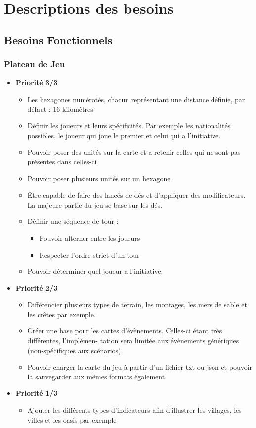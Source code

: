 \documentclass{article}[a4paper, 12pt]
\begin{document}
\section{Descriptions des besoins}
\subsection{Besoins Fonctionnels}
\subsubsection{Plateau de Jeu}

\begin{itemize}
    \item \textbf{Priorité 3/3}
    \begin{itemize}
        \item Les hexagones numérotés, chacun représentant une distance définie, par défaut : 16 kilomètres
        \item Définir les joueurs et leurs spécificités. Par exemple les nationalités possibles, le joueur
qui joue le premier et celui qui a l’initiative.
        \item Pouvoir poser des unités sur la carte et a retenir celles qui ne sont pas présentes dans
celles-ci
        \item Pouvoir poser plusieurs unités sur un hexagone.
        \item Être capable de faire des lancés de dés et d’appliquer des modificateurs. La majeure partie
du jeu se base sur les dés.
        \item Définir une séquence de tour :
        \begin{itemize}
            \item Pouvoir alterner entre les joueurs
            \item Respecter l’ordre strict d’un tour
        \end{itemize}
        \item Pouvoir déterminer quel joueur a l’initiative.
    \end{itemize}
    \item \textbf{Priorité 2/3}
    \begin{itemize}
        \item Différencier plusieurs types de terrain, les montages, les mers de sable et les crêtes
par exemple.
        \item Créer une base pour les cartes d’évènements. Celles-ci étant très différentes, l’implémen-
tation sera limitée aux évènements génériques (non-spécifiques aux scénarios).
        \item Pouvoir charger la carte du jeu à partir d’un fichier txt ou json et pouvoir la sauvegarder
aux mêmes formats également.
    \end{itemize}
    \item \textbf{Priorité 1/3}
    \begin{itemize}
        \item Ajouter les différents types d’indicateurs afin d’illustrer les villages, les villes et les
oasis par exemple
    \end{itemize}
\end{itemize}
\end{document}
